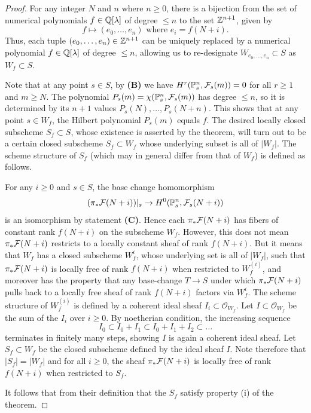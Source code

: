 \begin{proof}
For any integer $N$ and $n$ where $n\ge 0$,
there is a bijection from the set of numerical polynomials
$f\in \mathbb{Q}[\lambda]$ of degree $\le n$ to the set $\mathbb{Z}^{n+1}$,
given by
$$f \mapsto (e_0,\ldots,e_n)\mbox{ where }e_i = f(N+i).$$
Thus, each tuple $(e_0,\ldots,e_n) \in \mathbb{Z}^{n+1}$ can be uniquely
replaced by a numerical polynomial
$f\in \mathbb{Q}[\lambda]$ of degree $\le n$, allowing us to re-designate
$W_{e_0,\ldots,e_n} \subset S$ as $W_f \subset S$.



Note that at any point $s\in S$,
by \textbf{(B)} we have
$H^r(\mathbb{P}^n_s,\mathcal{F}_s(m)) = 0$ for all $r\ge 1$ and $m\ge N$.
The polynomial $P_s(m) = \chi(\mathbb{P}^n_s,\mathcal{F}_s(m))$ has degree $\le n$,
so it is determined by its $n+1$ values $P_s(N),\ldots, P_s(N+n)$.
This shows that at any point $s\in W_f$, the Hilbert polynomial
$P_s(m)$ equals $f$. The desired locally closed subscheme $S_f \subset S$,
whose existence is asserted by the theorem,
will turn out to be a certain closed subscheme $S_f \subset W_f$ whose
underlying subset is all of $|W_f|$. The scheme structure of
$S_f$ (which may in general differ from that of $W_f$) is defined as follows.

For any $i\ge 0$ and $s\in S$, the base change homomorphism
$$(\pi_*\mathcal{F}(N+i))|_s \to  H^0(\mathbb{P}^n_s,\mathcal{F}_s(N+i))$$
is an isomorphism by statement \textbf{(C)}.
Hence each $\pi_*\mathcal{F}(N+i)$ has fibers of constant rank $f(N+i)$
on the subscheme $W_f$. However, this does not mean $\pi_*\mathcal{F}(N+i)$
restricts to a locally constant sheaf of rank $f(N+i)$. But it means that
$W_f$ has a closed subscheme $W_f^i$,
whose underlying set is all of $|W_f|$, such that
$\pi_*\mathcal{F}(N+i)$ is locally free of rank $f(N+i)$ when restricted to
$W_f^{(i)}$, and moreover has the property that any base-change
$T\to S$ under which $\pi_*\mathcal{F}(N+i)$ pulls back to a
locally free sheaf of rank $f(N+i)$ factors via $W_f^i$.
The scheme structure of $W_f^{(i)}$ is defined by a coherent ideal sheaf
$I_i \subset {\mathcal O}_{W_f}$.
Let $I\subset {\mathcal O}_{W_f}$ be the sum of the $I_i$ over $i\ge 0$.
By noetherian condition, the increasing sequence
$$I_0 \subset I_0 + I_1 \subset I_0 + I_1 + I_2 \subset \ldots $$
terminates in finitely many steps, showing $I$ is again a coherent
ideal sheaf. Let $S_f\subset W_f$ be the closed subscheme defined by the
ideal sheaf $I$. Note therefore that $|S_f| = |W_f|$
and for all $i\ge 0$, the sheaf $\pi_*\mathcal{F}(N+i)$ is locally free of
rank $f(N+i)$ when restricted to $S_f$.



It follows that from their definition that
the $S_f$ satisfy property (i) of the theorem.


\end{proof}
